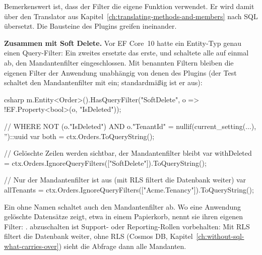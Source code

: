 Bemerkenswert ist, dass der Filter die eigene Funktion
verwendet. Er wird damit über den Translator aus
Kapitel~\ref{ch:translating-methods-and-members} nach SQL übersetzt. Die Bausteine des
Plugins greifen ineinander.

\textbf{Zusammen mit Soft Delete.} Vor EF Core~10 hatte ein Entity-Typ genau einen
Query-Filter: Ein zweites  ersetzte das erste,
und  schaltete alle auf einmal
ab, den Mandantenfilter eingeschlossen. Mit benannten Filtern bleiben die eigenen Filter der
Anwendung unabhängig von denen des Plugins (der Test schaltet den Mandantenfilter mit
 ein; standardmäßig ist er aus):

\begin{sourcecode}{csharp}
m.Entity<Order>().HasQueryFilter("SoftDelete", o => !EF.Property<bool>(o, "IsDeleted"));

// WHERE NOT (o."IsDeleted") AND o."TenantId" = nullif(current_setting(...), '')::uuid
var both = ctx.Orders.ToQueryString();

// Gelöschte Zeilen werden sichtbar, der Mandantenfilter bleibt
var withDeleted = ctx.Orders.IgnoreQueryFilters(["SoftDelete"]).ToQueryString();

// Nur der Mandantenfilter ist aus (mit RLS filtert die Datenbank weiter)
var allTenants = ctx.Orders.IgnoreQueryFilters(["Acme.Tenancy"]).ToQueryString();
\end{sourcecode}

\begin{important}
  Ein  ohne Namen schaltet auch
  den Mandantenfilter ab. Wo eine Anwendung gelöschte Datensätze zeigt, etwa in einem
  Papierkorb, nennt sie ihren eigenen Filter:
  .
   abzuschalten ist Support- oder Reporting-Rollen vorbehalten:
  Mit RLS filtert die Datenbank weiter, ohne RLS (Cosmos DB,
  Kapitel~\ref{ch:without-sql-what-carries-over}) sieht die Abfrage dann alle Mandanten.
\end{important}

